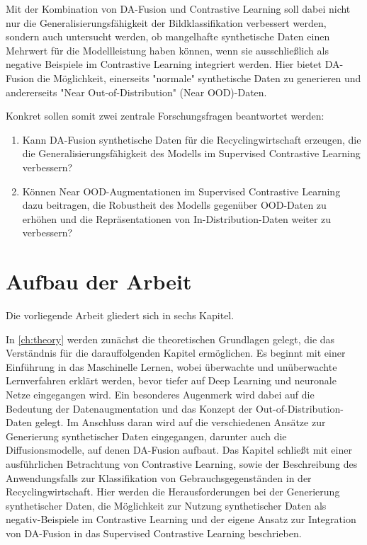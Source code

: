 Mit der Kombination von DA-Fusion und Contrastive Learning soll dabei nicht nur die Generalisierungsfähigkeit der Bildklassifikation verbessert werden, sondern auch untersucht werden, ob mangelhafte synthetische Daten einen Mehrwert für die Modellleistung haben können, wenn sie ausschließlich als negative Beispiele im Contrastive Learning integriert werden. Hier bietet DA-Fusion die Möglichkeit, einerseits "normale" synthetische Daten zu generieren und andererseits "Near Out-of-Distribution" (Near OOD)-Daten.

\newpage

Konkret sollen somit zwei zentrale Forschungsfragen beantwortet werden:

\begin{enumerate}
    \item Kann DA-Fusion synthetische Daten für die Recyclingwirtschaft erzeugen, die die Generalisierungsfähigkeit des Modells im Supervised Contrastive Learning verbessern?
    \item Können Near OOD-Augmentationen im Supervised Contrastive Learning dazu beitragen, die Robustheit des Modells gegenüber OOD-Daten zu erhöhen und die Repräsentationen von In-Distribution-Daten weiter zu verbessern?
\end{enumerate}

\section{Aufbau der Arbeit} \label{sec:structure}

Die vorliegende Arbeit gliedert sich in sechs Kapitel. 

In \autoref{ch:theory} werden zunächst die theoretischen Grundlagen gelegt, die das Verständnis für die darauffolgenden Kapitel ermöglichen. Es beginnt mit einer Einführung in das Maschinelle Lernen, wobei überwachte und unüberwachte Lernverfahren erklärt werden, bevor tiefer auf Deep Learning und neuronale Netze eingegangen wird. Ein besonderes Augenmerk wird dabei auf die Bedeutung der Datenaugmentation und das Konzept der Out-of-Distribution-Daten gelegt. Im Anschluss daran wird auf die verschiedenen Ansätze zur Generierung synthetischer Daten eingegangen, darunter auch die Diffusionsmodelle, auf denen DA-Fusion aufbaut. Das Kapitel schließt mit einer ausführlichen Betrachtung von Contrastive Learning, sowie der Beschreibung des Anwendungsfalls zur Klassifikation von Gebrauchsgegenständen in der Recyclingwirtschaft. Hier werden die Herausforderungen bei der Generierung synthetischer Daten, die Möglichkeit zur Nutzung synthetischer Daten als negativ-Beispiele im Contrastive Learning und der eigene Ansatz zur Integration von DA-Fusion in das Supervised Contrastive Learning beschrieben.


